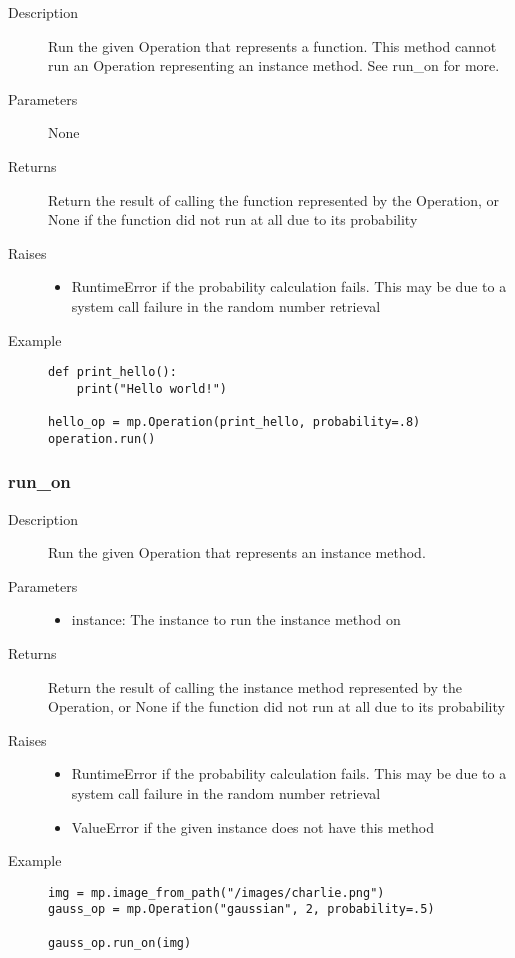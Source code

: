 \begin{description}
   \item[Description] Run the given Operation that represents a function. This method cannot run an Operation representing an instance method. See run\_on for more.
   \item[Parameters] None
   \item[Returns] Return the result of calling the function represented by the Operation, or None if the function did not run at all due to its probability
   \item[Raises] \phantom{}
   \begin{itemize}
       \item RuntimeError if the probability calculation fails. This may be due to a system call failure in the random number retrieval
   \end{itemize}
   \item[Example] \phantom{}
   \begin{lstlisting}
def print_hello():
    print("Hello world!")

hello_op = mp.Operation(print_hello, probability=.8)
operation.run()

\end{lstlisting}
\end{description}

\subsubsection{run\_on}

\begin{description}
   \item[Description] Run the given Operation that represents an instance method.
   \item[Parameters]
   \begin{itemize}
       \item instance: The instance to run the instance method on
   \end{itemize}
   \item[Returns] Return the result of calling the instance method represented by the Operation, or None if the function did not run at all due to its probability
   \item[Raises] \phantom{}
   \begin{itemize}
       \item RuntimeError if the probability calculation fails. This may be due to a system call failure in the random number retrieval
       \item ValueError if the given instance does not have this method
   \end{itemize}
   \item[Example] \phantom{}
   \begin{lstlisting}
img = mp.image_from_path("/images/charlie.png")
gauss_op = mp.Operation("gaussian", 2, probability=.5)

gauss_op.run_on(img)

\end{lstlisting}
\end{description}

